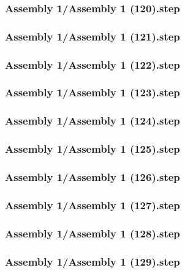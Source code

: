 \documentclass[a4paper,12pt]{article}
\begin{document}
\subsubsection{Assembly 1/Assembly 1 (120).step}

\subsubsection{Assembly 1/Assembly 1 (121).step}

\subsubsection{Assembly 1/Assembly 1 (122).step}

\subsubsection{Assembly 1/Assembly 1 (123).step}

\subsubsection{Assembly 1/Assembly 1 (124).step}

\subsubsection{Assembly 1/Assembly 1 (125).step}

\subsubsection{Assembly 1/Assembly 1 (126).step}

\subsubsection{Assembly 1/Assembly 1 (127).step}

\subsubsection{Assembly 1/Assembly 1 (128).step}

\subsubsection{Assembly 1/Assembly 1 (129).step}

\end{document}

